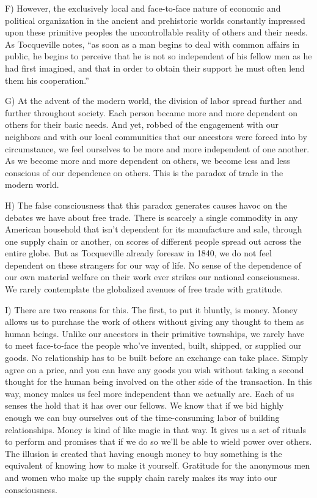 \documentclass[UTF8,11pt]{ctexart}
\begin{document}
F) However, the exclusively local and face-to-face nature of economic and political organization in the ancient and prehistoric worlds constantly impressed upon these primitive peoples the uncontrollable reality of others and their needs. As Tocqueville notes, “as soon as a man begins to deal with common affairs in public, he begins to perceive that he is not so independent of his fellow men as he had first imagined, and that in order to obtain their support he must often lend them his cooperation.”


G) At the advent of the modern world, the division of labor spread further and further throughout society. Each person became more and more dependent on others for their basic needs. And yet, robbed of the engagement with our neighbors and with our local communities that our ancestors were forced into by circumstance, we feel ourselves to be more and more independent of one another. As we become more and more dependent on others, we become less and less conscious of our dependence on others. This is the paradox of trade in the modern world.


H) The false consciousness that this paradox generates causes havoc on the debates we have about free trade. There is scarcely a single commodity in any American household that isn’t dependent for its manufacture and sale, through one supply chain or another, on scores of different people spread out across the entire globe. But as Tocqueville already foresaw in 1840, we do not feel dependent on these strangers for our way of life. No sense of the dependence of our own material welfare on their work ever strikes our national consciousness. We rarely contemplate the globalized avenues of free trade with gratitude.


I) There are two reasons for this. The first, to put it bluntly, is money. Money allows us to purchase the work of others without giving any thought to them as human beings. Unlike our ancestors in their primitive townships, we rarely have to meet face-to-face the people who’ve invented, built, shipped, or supplied our goods. No relationship has to be built before an exchange can take place. Simply agree on a price, and you can have any goods you wish without taking a second thought for the human being involved on the other side of the transaction. In this way, money makes us feel more independent than we actually are. Each of us senses the hold that it has over our fellows. We know that if we bid highly enough we can buy ourselves out of the time-consuming labor of building relationships. Money is kind of like magic in that way. It gives us a set of rituals to perform and promises that if we do so we’ll be able to wield power over others. The illusion is created that having enough money to buy something is the equivalent of knowing how to make it yourself. Gratitude for the anonymous men and women who make up the supply chain rarely makes its way into our consciousness.
\end{document}
